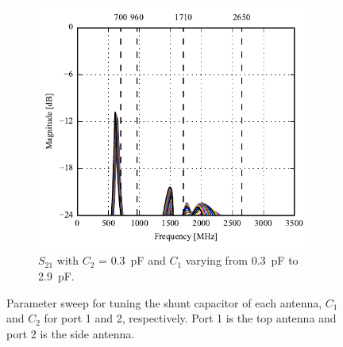 \begin{figure}[htbp]
\begin{subfigure}[b]{0.49\linewidth}
        \label{fig:ant1_s11}
    \end{subfigure}
    \hfill
    \begin{subfigure}[b]{0.49\linewidth}
        \centering
        \includegraphics{img/tech_sol/monopole/play_mode/s21_s22}
        \caption{$S_{21}$ with $C_2$ = \SI{0.3}{pF} and $C_1$ varying from \SI{0.3}{pF} to \SI{2.9}{pF}.}
        \label{fig:ant1_s22}
    \end{subfigure}
    \caption{Parameter sweep for tuning the shunt capacitor of each antenna, $C_1$ and $C_2$ for port 1 and 2, respectively. Port 1 is the top antenna and port 2 is the side antenna.}
    \label{fig:sparam_mono}
\end{figure}

